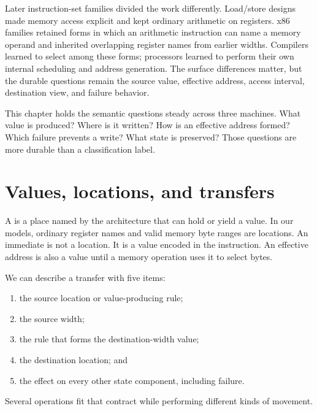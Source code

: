 Later instruction-set families divided the work differently. Load/store
designs made memory access explicit and kept ordinary arithmetic on registers.
x86 families retained forms in which an arithmetic instruction can name a
memory operand and inherited overlapping register names from earlier widths.
Compilers learned to select among these forms; processors learned to perform
their own internal scheduling and address generation. The surface differences
matter, but the durable questions remain the source value, effective address,
access interval, destination view, and failure behavior.

This chapter holds the semantic questions steady across three machines. What
value is produced? Where is it written? How is an effective address formed?
Which failure prevents a write? What state is preserved? Those questions are
more durable than a classification label.

\section{Values, locations, and transfers}

A  is a place named by the architecture that can hold or
yield a value. In our models, ordinary register names and valid memory byte
ranges are locations. An immediate is not a location. It is a value encoded in
the instruction. An effective address is also a value until a memory operation
uses it to select bytes.

We can describe a transfer with five items:

\begin{enumerate}
\item the source location or value-producing rule;
\item the source width;
\item the rule that forms the destination-width value;
\item the destination location; and
\item the effect on every other state component, including failure.
\end{enumerate}

Several operations fit that contract while performing different kinds of
movement.

